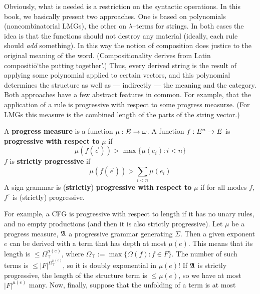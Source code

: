 Obviously, what is needed is a restriction on the syntactic
operations. In this book, we basically present two approaches. 
One is based on polynomials (noncombinatorial LMGs), the other 
on $\lambda$--terms for strings. In both cases the idea is that 
the functions should not destroy any material (ideally, each rule 
should {\it add\/} something).  In this way the notion of composition 
does justice to the original meaning of the word. (Compositionality 
derives from Latin \textsf{compositi\={o}}`the putting together'.) 
Thus, every derived string is the result of applying some polynomial 
applied to certain vectors, and this polynomial determines the structure
as well as --- indirectly  --- the meaning and the category. 
Both approaches have a few abstract features in common. For example, 
that the application of a rule is progressive with respect to some 
progress measurse. (For LMGs this measure is the combined length 
of the parts of the string vector.)
\begin{defn}
A \textbf{progress measure} is a  function $\mu : E \rightarrow \omega$.
A function $f : E^n \rightarrow E$ is \textbf{progressive with respect to} 
$\mu$ if 
\begin{equation}
\mu(f(\vec{e})) > \max \{\mu(e_i) : i < n\}
\end{equation}
$f$ is \textbf{strictly progressive} if 
\begin{equation}
\mu(f(\vec{e})) > \sum_{i < n} \mu(e_i)
\end{equation}
A sign grammar is (\textbf{strictly}) \textbf{progressive with respect 
to} $\mu$ if for all modes $f$, $f^{\varepsilon}$ is (strictly) 
progressive.
\end{defn}
For example, a CFG is progressive with respect to length if it has 
no unary rules, and no empty productions (and then it is also strictly 
progressive). Let $\mu$ be a progress measure, $\mathfrak{A}$ a progressive 
grammar generating $\Sigma$. Then a given exponent $e$ can be derived 
with a term that has depth at most $\mu(e)$. This means that its 
length is $\leq \Omega_{\intercal}^{\mu(e)}$, where $\Omega_{\intercal} := 
\max \{\Omega(f) : f \in F\}$. The number of such terms is 
$\leq |F|^{\Omega_{\intercal}^{\mu(e)}}$, so it is doubly exponential in $\mu(e)$! 
If $\mathfrak{A}$ is strictly progressive, the length of the structure term 
is $\leq \mu(e)$, so we have at most $|F|^{\mu(e)}$ many. Now, 
finally, suppose that the unfolding of a term is at most 
